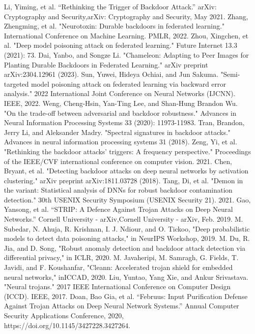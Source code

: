 \documentclass[conference]{IEEEtran}
\begin{document}
\begin{thebibliography}{00}
     Li, Yiming, et al. “Rethinking the Trigger of Backdoor Attack.” arXiv: Cryptography and Security,arXiv: Cryptography and Security, May 2021.
     Zhang, Zhengming, et al. "Neurotoxin: Durable backdoors in federated learning." International Conference on Machine Learning. PMLR, 2022.
     Zhou, Xingchen, et al. "Deep model poisoning attack on federated learning." Future Internet 13.3 (2021): 73.
     Dai, Yanbo, and Songze Li. "Chameleon: Adapting to Peer Images for Planting Durable Backdoors in Federated Learning." arXiv preprint arXiv:2304.12961 (2023).
     Sun, Yuwei, Hideya Ochiai, and Jun Sakuma. "Semi-targeted model poisoning attack on federated learning via backward error analysis." 2022 International Joint Conference on Neural Networks (IJCNN). IEEE, 2022.
     Weng, Cheng-Hsin, Yan-Ting Lee, and Shan-Hung Brandon Wu. "On the trade-off between adversarial and backdoor robustness." Advances in Neural Information Processing Systems 33 (2020): 11973-11983.
     Tran, Brandon, Jerry Li, and Aleksander Madry. "Spectral signatures in backdoor attacks." Advances in neural information processing systems 31 (2018).
     Zeng, Yi, et al. "Rethinking the backdoor attacks' triggers: A frequency perspective." Proceedings of the IEEE/CVF international conference on computer vision. 2021.
     Chen, Bryant, et al. "Detecting backdoor attacks on deep neural networks by activation clustering." arXiv preprint arXiv:1811.03728 (2018).
     Tang, Di, et al. "Demon in the variant: Statistical analysis of {DNNs} for robust backdoor contamination detection." 30th USENIX Security Symposium (USENIX Security 21). 2021.
     Gao, Yansong, et al. “STRIP: A Defence Against Trojan Attacks on Deep Neural Networks.” Cornell University - arXiv,Cornell University - arXiv, Feb. 2019.
     M. Subedar, N. Ahuja, R. Krishnan, I. J. Ndiour, and O. Tickoo, "Deep probabilistic models to detect data poisoning attacks," in NeurIPS Workshop, 2019.
     M. Du, R. Jia, and D. Song, "Robust anomaly detection and backdoor attack detection via differential privacy," in ICLR, 2020.
     M. Javaheripi, M. Samragh, G. Fields, T. Javidi, and F. Koushanfar, "Cleann: Accelerated trojan shield for embedded neural networks," inICCAD, 2020.
     Liu, Yuntao, Yang Xie, and Ankur Srivastava. "Neural trojans." 2017 IEEE International Conference on Computer Design (ICCD). IEEE, 2017.
     Doan, Bao Gia, et al. “Februus: Input Purification Defense Against Trojan Attacks on Deep Neural Network Systems.” Annual Computer Security Applications Conference, 2020, https://doi.org/10.1145/3427228.3427264.

\end{thebibliography}
\end{document}
